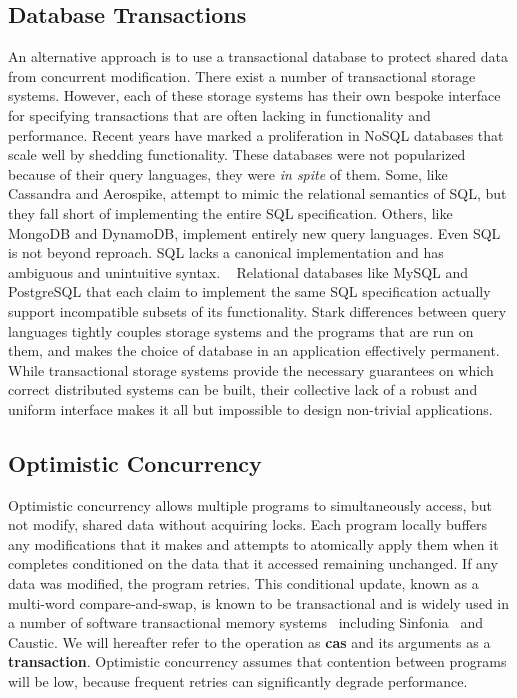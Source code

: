 \documentclass[../main.tex]{subfiles}
\begin{document}
  \subsection{Database Transactions}
  An alternative approach is to use a transactional database to protect shared data from concurrent
  modification. There exist a number of transactional storage systems. However, each of these
  storage systems has their own bespoke interface for specifying transactions that are often lacking
  in functionality and performance. Recent years have marked a proliferation in NoSQL databases that
  scale well by shedding functionality. These databases were not popularized because of their query
  languages, they were \emph{in spite} of them. Some, like Cassandra and Aerospike, attempt to mimic
  the relational semantics of SQL, but they fall short of implementing the entire SQL specification.
  Others, like MongoDB and DynamoDB, implement entirely new query languages. Even SQL is not beyond
  reproach. SQL lacks a canonical implementation and has ambiguous and unintuitive syntax.
  ~\cite{sql} Relational databases like MySQL and PostgreSQL that each claim to implement the same
  SQL specification actually support incompatible subsets of its functionality. Stark differences
  between query languages tightly couples storage systems and the programs that are run on them, and
  makes the choice of database in an application effectively permanent. While transactional storage
  systems provide the necessary guarantees on which correct distributed systems can be built, their
  collective lack of a robust and uniform interface makes it all but impossible to design
  non-trivial applications.

  \subsection{Optimistic Concurrency}
  Optimistic concurrency allows multiple programs to simultaneously access, but not modify, shared
  data without acquiring locks. Each program locally buffers any modifications that it makes and
  attempts to atomically apply them when it completes conditioned on the data that it accessed
  remaining unchanged. If any data was modified, the program retries. This conditional update, known
  as a multi-word compare-and-swap, is known to be transactional and is widely used in a number of
  software transactional memory systems~\cite{stm} including Sinfonia~\cite{sinfonia} and Caustic.
  We will hereafter refer to the operation as \textbf{cas} and its arguments as a
  \textbf{transaction}. Optimistic concurrency assumes that contention between programs will be low,
  because frequent retries can significantly degrade performance.
\end{document}
